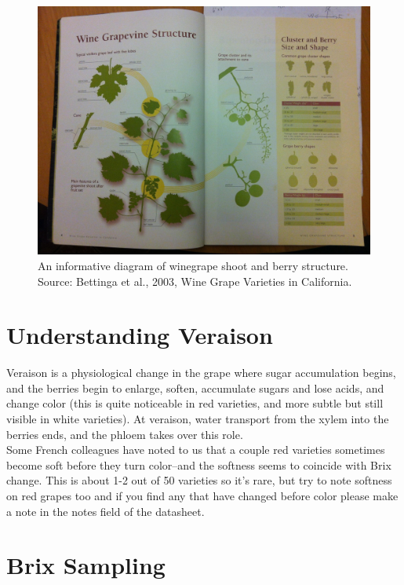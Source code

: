 \documentclass[11pt,letter]{article}
\begin{document}
\begin{enumerate}
\begin{figure}
  \includegraphics[width=\linewidth]{Bettiga2003Diagram.jpg}
  \caption{An informative diagram of winegrape shoot and berry structure. Source: Bettinga et al., 2003, Wine Grape Varieties in California. }
  \label{fig:Bettiga2003Diagram}
\end{figure}
	
\end{enumerate}

\section{Understanding Veraison}
Veraison is a physiological change in the grape where sugar accumulation begins, and the berries begin to enlarge, soften, accumulate sugars and lose acids, and change color (this is quite noticeable in red varieties, and more subtle but still visible in white varieties). At veraison, water transport from the xylem into the berries ends, and the phloem takes over this role.\\ 

Some French colleagues have noted to us that a couple red varieties sometimes become soft before they turn color--and the softness seems to coincide with Brix change. This is about 1-2 out of 50 varieties so it's rare, but try to note softness on red grapes too and if you find any that have changed before color please make a note in the notes field of the datasheet.

\section{Brix Sampling}
\end{document}
